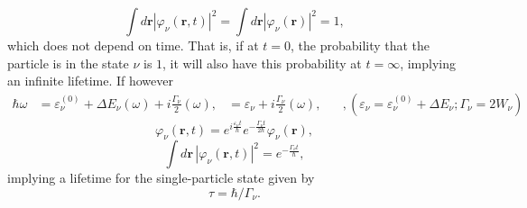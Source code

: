 \begin{equation}
\int d\mathbf r|\varphi_{\nu}(\mathbf r,t)|^2 = \int d\mathbf r  |\varphi_{\nu}(\mathbf r)|^2 = 1 ,
\label{eqn:44}
\end{equation}
which does not depend on time. That is, if at $t=0$, the probability that the particle is in the state $\nu$ is $1$, it will also have this probability at $t=\infty$, implying an infinite lifetime. If however
\begin{eqnarray}
\nonumber
\hbar\omega &= \varepsilon_{\nu}^{(0)} + \Delta E_{\nu}(\omega) + i \frac{\Gamma_\nu}{2} (\omega),
\nonumber
&= \varepsilon_{\nu} + i \frac{\Gamma_{\nu}}{2}(\omega), \;\;\;\;\;\; , (\varepsilon_{\nu} = \varepsilon_{\nu}^{(0)} + \Delta E_{\nu};\Gamma_\nu=2W_\nu)
\end{eqnarray}
\begin{equation}
\nonumber
\varphi_{\nu}(\mathbf r, t) = e^{i \frac{\varepsilon_{\nu} t}{\hbar}} e^{- \frac{\Gamma_{\nu} t}{2\hbar}} \varphi_{\nu}(\mathbf r),
\end{equation}
\begin{equation}
\int d\mathbf r\, |\varphi_{\nu} (\mathbf r, t)|^2 = e^{- \frac{\Gamma_{\nu} t}{\hbar}} ,
\label{eqn:44b}
\end{equation}
implying a lifetime for the single-particle state given by
\begin{equation}
\tau =\hbar/ \Gamma_\nu .
\label{eqn:45}
\end{equation}

